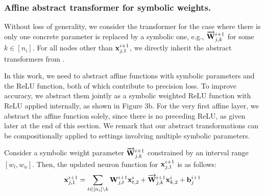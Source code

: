 \subsubsection{Affine abstract transformer for symbolic weights.}\label{sec:symWeight}
Without loss of generality, we consider the transformer for the case where there is only one concrete parameter is replaced by a symbolic one, e.g., $\overrightarrow{{\mathbf{W}}}^{i+1}_{j,k}$ for some $k\in[n_i]$.
For all nodes other than ${\mathbf{x}}^{i+1}_{j,1}$, we directly inherit the abstract transformers from \deepPoly.


In this work, we need to abstract affine functions with symbolic parameters and the ReLU function, both of which contribute to precision loss. To improve accuracy, we abstract them jointly as a symbolic weighted ReLU function with ReLU applied internally, as shown in Figure 3b. For the very first affine layer, we abstract the affine function solely, since there is no preceding ReLU, as given later at the end of this section. We remark that our abstract transformations can be compositionally applied to settings involving multiple symbolic parameters. 

\smallskip
\noindent
{}
Consider a symbolic weight parameter $\overrightarrow{{\mathbf{W}}}^{i+1}_{j,k}$ constrained by an interval range $[w_l,w_u]$. Then, the updated neuron function for ${\mathbf{x}}^{i+1}_{j,1}$ is as follows: 
\begin{equation}\label{eq:symWeight}
    {\mathbf{x}}^{i+1}_{j,1}=\sum_{t\in [n_{i}]\backslash k}{\mathbf{W}}^{i+1}_{j,t}{\mathbf{x}}^i_{t,2}+\overrightarrow{{\mathbf{W}}}^{i+1}_{j,k}{\mathbf{x}}^i_{k,2}+{\mathbf{b}}^{i+1}_j
\end{equation}


